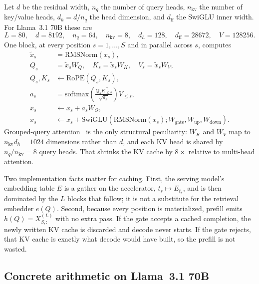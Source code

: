 Let $d$ be the residual width, $n_q$ the number of query heads, $n_{\mathrm{kv}}$ the number of key/value heads, $d_h=d/n_q$ the head dimension, and $d_{\mathrm{ff}}$ the SwiGLU inner width. For Llama~3.1 70B these are
\[
L=80,\quad d=8192,\quad n_q=64,\quad n_{\mathrm{kv}}=8,\quad d_h=128,\quad d_{\mathrm{ff}}=28672,\quad V=128256.
\]
One block, at every position $s=1,\ldots,S$ and in parallel across $s$, computes
\begin{align}
\label{eq:block}
\tilde x_s &= \mathrm{RMSNorm}(x_s), \nonumber\\
Q_s &= \tilde x_s W_Q,\quad
K_s = \tilde x_s W_K,\quad
V_s = \tilde x_s W_V, \nonumber\\
Q_s,K_s &\leftarrow \mathrm{RoPE}(Q_s,K_s), \nonumber\\
a_s &= \mathrm{softmax}\!\left(\frac{Q_s K_{\le s}^\top}{\sqrt{d_h}}\right) V_{\le s}, \nonumber\\
x_s &\leftarrow x_s + a_s W_O, \nonumber\\
x_s &\leftarrow x_s + \mathrm{SwiGLU}(\mathrm{RMSNorm}(x_s); W_{\mathrm{gate}},W_{\mathrm{up}},W_{\mathrm{down}}).
\end{align}
Grouped-query attention~\citep{ainslie2023gqa} is the only structural peculiarity: $W_K$ and $W_V$ map to $n_{\mathrm{kv}}d_h=1024$ dimensions rather than $d$, and each KV head is shared by $n_q/n_{\mathrm{kv}}=8$ query heads. That shrinks the KV cache by $8\times$ relative to multi-head attention.

Two implementation facts matter for caching. First, the serving model's embedding table $E$ is a gather on the accelerator, $t_s\mapsto E_{t_s}$, and is then dominated by the $L$ blocks that follow; it is not a substitute for the retrieval embedder $e(Q)$. Second, because every position is materialized, prefill emits $h(Q)=X^{(L)}_{S,:}$ with no extra pass. If the gate accepts a cached completion, the newly written KV cache is discarded and decode never starts. If the gate rejects, that KV cache is exactly what decode would have built, so the prefill is not wasted.

\subsection{Concrete arithmetic on Llama~3.1 70B}
\label{sec:cost-flops}

